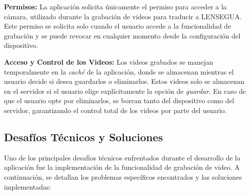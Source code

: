 \textbf{Permisos:} La aplicación solicita únicamente el permiso para acceder a la cámara, utilizado durante la grabación de videos para traducir a LENSEGUA. Este permiso se solicita solo cuando el usuario accede a la funcionalidad de grabación y se puede revocar en cualquier momento desde la configuración del dispositivo.

\textbf{Acceso y Control de los Videos:} Los videos grabados se manejan temporalmente en la \textit{caché} de la aplicación, donde se almacenan mientras el usuario decide si desea guardarlos o eliminarlos. Estos videos solo se almacenan en el servidor si el usuario elige explícitamente la opción de \textit{guardar}. En caso de que el usuario opte por eliminarlos, se borran tanto del dispositivo como del servidor, garantizando el control total de los videos por parte del usuario.


\subsection{Desafíos Técnicos y Soluciones}

Uno de los principales desafíos técnicos enfrentados durante el desarrollo de la aplicación fue la implementación de la funcionalidad de grabación de video. A continuación, se detallan los problemas específicos encontrados y las soluciones implementadas:

